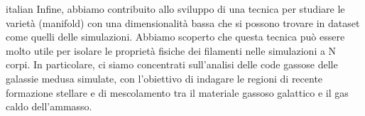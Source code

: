 \begin{otherlanguage*}{italian}
Infine, abbiamo contribuito allo sviluppo di una tecnica per studiare le varietà (manifold) con una dimensionalità bassa che si possono trovare in dataset come quelli delle simulazioni.
Abbiamo scoperto che questa tecnica può essere molto utile per isolare le proprietà fisiche dei filamenti nelle simulazioni a N corpi.
In particolare, ci siamo concentrati sull'analisi delle code gassose delle galassie medusa simulate, con l'obiettivo di indagare le regioni di recente formazione stellare e di mescolamento tra il materiale gassoso galattico e il gas caldo dell'ammasso.
\end{otherlanguage*}
